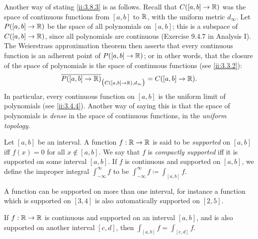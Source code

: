 \begin{note}
  Another way of stating \cref{ii:3.8.3} is as follows.
  Recall that \(C([a, b] \to \mathbb{R})\) was the space of continuous functions from \([a, b]\) to \(\mathbb{R}\), with the uniform metric \(d_\infty\).
  Let \(P([a, b] \to \mathbb{R})\) be the space of all polynomials on \([a, b]\);
  this is a subspace of \(C([a, b] \to \mathbb{R})\), since all polynomials are continuous (Exercise 9.4.7 in Analysis I).
  The Weierstrass approximation theorem then asserts that every continuous function is an adherent point of \(P([a, b] \to \mathbb{R})\);
  or in other words, that the closure of the space of polynomials is the space of continuous functions (see \cref{ii:3.3.2}):
  \[
    \overline{P([a, b] \to \mathbb{R})}_{\big(C([a, b] \to \mathbb{R}), d_\infty\big)} = C([a, b] \to \mathbb{R}).
  \]
  In particular, every continuous function on \([a, b]\) is the uniform limit of polynomials (see \cref{ii:3.4.4}).
  Another way of saying this is that the space of polynomials is \emph{dense} in the space of continuous functions, in the \emph{uniform topology}.
\end{note}

\begin{defn}\label{ii:3.8.4}
  Let \([a, b]\) be an interval.
  A function \(f : \mathbb{R} \to \mathbb{R}\) is said to be \emph{supported} on \([a, b]\) iff \(f(x) = 0\) for all \(x \notin [a, b]\).
  We say that \(f\) is \emph{compactly supported} iff it is supported on some interval \([a, b]\).
  If \(f\) is continuous and supported on \([a, b]\), we define the improper integral \(\int_{-\infty}^\infty f\) to be \(\int_{-\infty}^\infty f \coloneqq \int_{[a, b]} f\).
\end{defn}

\begin{note}
  A function can be supported on more than one interval, for instance a function which is supported on \([3, 4]\) is also automatically supported on \([2, 5]\).
\end{note}

\begin{lem}\label{ii:3.8.5}
  If \(f : \mathbb{R} \to \mathbb{R}\) is continuous and supported on an interval \([a, b]\), and is also supported on another interval \([c, d]\), then \(\int_{[a, b]} f = \int_{[c, d]} f\).
\end{lem}

